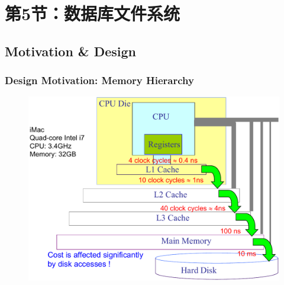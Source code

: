 \section{第5节：数据库文件系统} %
\subsection{Motivation \& Design} %

\begin{frame}[fragile]
    \frametitle{Design Motivation: Memory Hierarchy}
    \begin{figure}
        \includegraphics[width=0.6\linewidth]{figs/dbfile-mem-hierarchy.pdf}
    \end{figure}
\end{frame}

